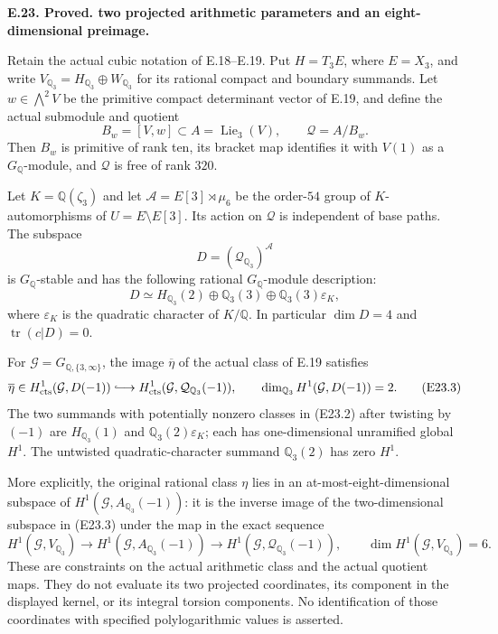 \documentclass[11pt,oneside]{article}
\makeatletter
\newcounter{statementanchor}
\newenvironment{statement}[3]{%
 \refstepcounter{statementanchor}\def\@currentlabel{#1}%
 \par\addvspace{9pt}\noindent
 \textbf{#1. #2. #3.}\par\nobreak\noindent\ignorespaces
}{\par\addvspace{5pt}}
\makeatother
\begin{document}
\begin{statement}{E.23}{Proved}{two projected arithmetic parameters and an eight-dimensional preimage}
\label{st:E.23}
\label{E-cubic-symmetry}
Retain the actual cubic notation of E.18--E.19. Put
$H=T_3E$, where $E=X_3$, and write
$V_{\mathbb Q_3}=H_{\mathbb Q_3}\oplus W_{\mathbb Q_3}$
for its rational compact and boundary summands. Let
$w\in\bigwedge^2V$ be the primitive compact determinant
vector of E.19, and define the actual submodule and quotient
\[
 B_w=[V,w]\subset A=\operatorname{Lie}_3(V),
 \qquad \mathcal Q=A/B_w.
 \tag{E23.1}
\]
Then $B_w$ is primitive of rank ten, its bracket map identifies
it with $V(1)$ as a $G_{\mathbb Q}$-module, and
$\mathcal Q$ is free of rank $320$.

Let $K=\mathbb Q(\zeta_3)$ and let
$\mathcal A=E[3]\rtimes\mu_6$ be the order-$54$ group of
$K$-automorphisms of $U=E\setminus E[3]$. Its action on
$\mathcal Q$ is independent of base paths. The subspace
\[
 D=(\mathcal Q_{\mathbb Q_3})^{\mathcal A}
\]
is $G_{\mathbb Q}$-stable and has the following rational
$G_{\mathbb Q}$-module description:
\[
 D\simeq H_{\mathbb Q_3}(2)\oplus
        \mathbb Q_3(3)\oplus
        \mathbb Q_3(3)\varepsilon_K,
 \tag{E23.2}
\]
where $\varepsilon_K$ is the quadratic character of $K/\mathbb Q$.
In particular $\dim D=4$ and $\operatorname{tr}(c|D)=0$.

For $\mathcal G=G_{\mathbb Q,\{3,\infty\}}$, the image
$\overline\eta$ of the actual class of E.19 satisfies
\[
 \overline\eta\in
 H^1_{\rm cts}(\mathcal G,D(-1))
 \lhook\joinrel\longrightarrow
 H^1_{\rm cts}(\mathcal G,\mathcal Q_{\mathbb Q_3}(-1)),
 \qquad
 \dim_{\mathbb Q_3}H^1(\mathcal G,D(-1))=2.
 \tag{E23.3}
\]
The two summands with potentially nonzero classes in (E23.2)
after twisting by $(-1)$ are $H_{\mathbb Q_3}(1)$ and
$\mathbb Q_3(2)\varepsilon_K$; each has one-dimensional
unramified global $H^1$. The untwisted quadratic-character
summand $\mathbb Q_3(2)$ has zero $H^1$.

More explicitly, the original rational class $\eta$ lies in
an at-most-eight-dimensional subspace of
$H^1(\mathcal G,A_{\mathbb Q_3}(-1))$: it is the inverse
image of the two-dimensional subspace in (E23.3) under the
map in the exact sequence
\[
 H^1(\mathcal G,V_{\mathbb Q_3})\longrightarrow
 H^1(\mathcal G,A_{\mathbb Q_3}(-1))\longrightarrow
 H^1(\mathcal G,\mathcal Q_{\mathbb Q_3}(-1)),
 \qquad \dim H^1(\mathcal G,V_{\mathbb Q_3})=6.
 \tag{E23.4}
\]
These are constraints on the actual arithmetic class and the
actual quotient maps. They do not evaluate its two projected
coordinates, its component in the displayed kernel, or its
integral torsion components. No identification of those
coordinates with specified polylogarithmic values is asserted.
\end{statement}
\end{document}
